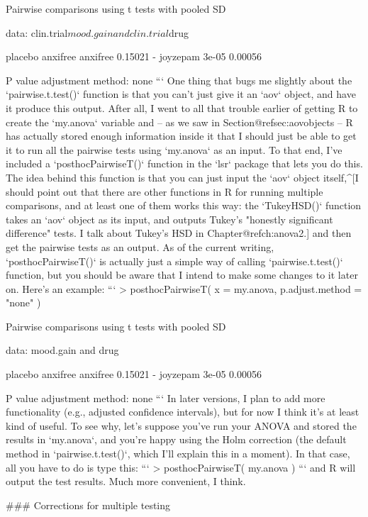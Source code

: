 	Pairwise comparisons using t tests with pooled SD 

data:  clin.trial$mood.gain and clin.trial$drug 

         placebo anxifree
anxifree 0.15021 -       
joyzepam 3e-05   0.00056 

P value adjustment method: none 
```
One thing that bugs me slightly about the `pairwise.t.test()` function is that you can't just give it an `aov` object, and have it produce this output. After all, I went to all that trouble earlier of getting R to create the `my.anova` variable and -- as we saw in Section@refsec:aovobjects -- R has actually stored enough information inside it that I should just be able to get it to run all the pairwise tests using `my.anova` as an input. To that end, I've included a `posthocPairwiseT()` function in the `lsr` package that lets you do this. The idea behind this function is that you can just input the `aov` object itself,^[I should point out that there are other functions in R for running multiple comparisons, and at least one of them works this way: the `TukeyHSD()` function takes an `aov` object as its input, and outputs Tukey's "honestly significant difference" tests. I talk about Tukey's HSD in Chapter@refch:anova2.] and then get the pairwise tests as an output. As of the current writing, `posthocPairwiseT()` is actually just a simple way of calling `pairwise.t.test()` function, but you should be aware that I intend to make some changes to it later on. Here's an example:
```
> posthocPairwiseT( x = my.anova, p.adjust.method = "none" )

	Pairwise comparisons using t tests with pooled SD 

data:  mood.gain and drug  

         placebo anxifree
anxifree 0.15021 -       
joyzepam 3e-05   0.00056 

P value adjustment method: none 
```
In later versions, I plan to add more functionality (e.g., adjusted  confidence intervals), but for now I think it's at least kind of useful. To see why, let's suppose you've run your ANOVA and stored the results in `my.anova`, and you're happy using the Holm correction (the default method in `pairwise.t.test()`, which I'll explain this in a moment). In that case, all you have to do is type this:
```
> posthocPairwiseT( my.anova )
```
and R will output the test results. Much more convenient, I think.



### Corrections for multiple testing


